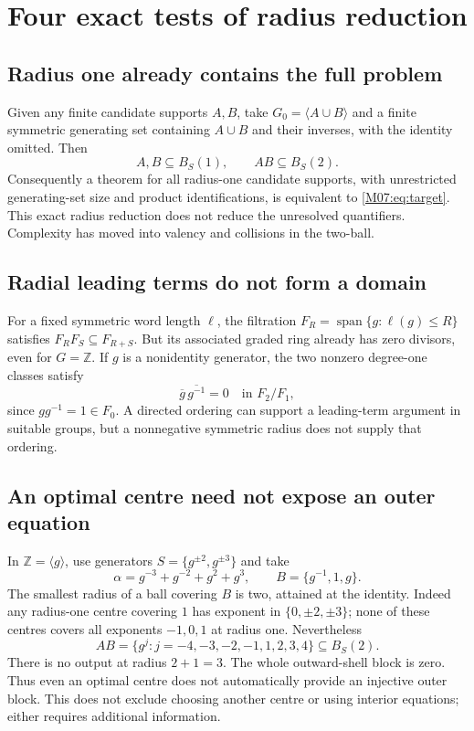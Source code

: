 \documentclass[11pt,a4paper,oneside]{report}
\theoremstyle{definition}
\theoremstyle{remark}
\newcommand{\Z}{\mathbb Z}
\begin{document}
\section{Four exact tests of radius reduction}

\subsection{Radius one already contains the full problem}

Given any finite candidate supports $A,B$, take
$G_0=\langle A\cup B\rangle$ and a finite symmetric generating
set containing $A\cup B$ and their inverses, with the identity
omitted. Then
\[
A,B\subseteq B_S(1),\qquad AB\subseteq B_S(2).
\]
Consequently a theorem for all radius-one candidate supports,
with unrestricted generating-set size and product identifications,
is equivalent to \eqref{M07:eq:target}. This exact radius reduction
does not reduce the unresolved quantifiers. Complexity has
moved into valency and collisions in the two-ball.

\subsection{Radial leading terms do not form a domain}

For a fixed symmetric word length $\ell$, the filtration
$F_R=\operatorname{span}\{g:\ell(g)\le R\}$ satisfies
$F_RF_S\subseteq F_{R+S}$. But its associated graded ring
already has zero divisors, even for $G=\Z$. If $g$ is a
nonidentity generator, the two nonzero degree-one classes satisfy
\[
\overline g\,\overline{g^{-1}}=0\quad\text{in }F_2/F_1,
\]
since $gg^{-1}=1\in F_0$. A directed ordering can support a
leading-term argument in suitable groups, but a nonnegative
symmetric radius does not supply that ordering.

\subsection{An optimal centre need not expose an outer equation}

In $\Z=\langle g\rangle$, use generators $S=\{g^{\pm2},g^{\pm3}\}$
and take
\[
\alpha=g^{-3}+g^{-2}+g^2+g^3,
\qquad B=\{g^{-1},1,g\}.
\]
The smallest radius of a ball covering $B$ is two, attained
at the identity. Indeed any radius-one centre covering $1$
has exponent in $\{0,\pm2,\pm3\}$; none of these centres
covers all exponents $-1,0,1$ at radius one.
Nevertheless
\[
AB=\{g^j:j=-4,-3,-2,-1,1,2,3,4\}\subseteq B_S(2).
\]
There is no output at radius $2+1=3$. The whole outward-shell
block is zero. Thus even an optimal centre does not automatically
provide an injective outer block. This does not exclude choosing
another centre or using interior equations; either requires
additional information.
\end{document}
